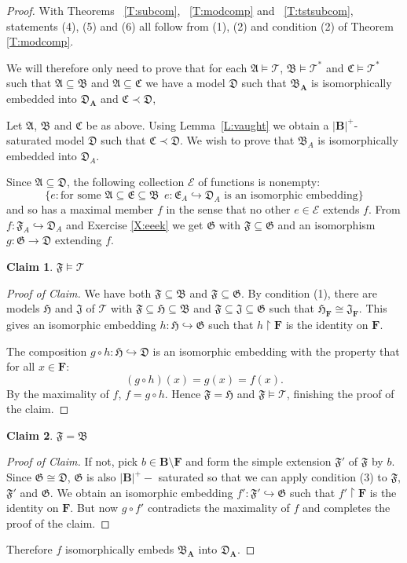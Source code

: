 \documentclass[titlepage, oneside]{amsbook}
\theoremstyle{plain}
\newtheorem*{claim}{Claim}
\theoremstyle{definition}
\theoremstyle{remark}
\newcommand{\theory}{\ensuremath{\mathcal{T}}}
\newcommand{\tee}{\ensuremath{\mathcal{T}}}
\newcommand{\tstar}{\ensuremath{\mathcal{T}^{\ast}}}
\newcommand{\seq}{\ensuremath{\subseteq}}
\newcommand{\ma}{\ensuremath{\mathfrak{A}}}
\newcommand{\mb}{\ensuremath{\mathfrak{B}}}
\newcommand{\mc}{\ensuremath{\mathfrak{C}}}
\newcommand{\md}{\ensuremath{\mathfrak{D}}}
\newcommand{\me}{\ensuremath{\mathfrak{E}}}
\newcommand{\mf}{\ensuremath{\mathfrak{F}}}
\newcommand{\mg}{\ensuremath{\mathfrak{G}}}
\newcommand{\mh}{\ensuremath{\mathfrak{H}}}
\newcommand{\mj}{\ensuremath{\mathfrak{J}}}
\newcommand{\ba}{\ensuremath{\mathbf{A}}}
\newcommand{\bb}{\ensuremath{\mathbf{B}}}
\begin{document}
\begin{proof}  With  Theorems ~\ref{T:subcom}, ~\ref{T:modcomp} and 
~\ref{T:tstsubcom}, statements (4), (5) and (6) all follow from (1), (2) and 
condition (2) of Theorem \ref{T:modcomp}.
 
We will therefore only need to prove that
for each $\ma \models \theory$, $\mb \models \theory^{\ast}$
and $\mc \models \tstar$ such that $\ma \seq \mb$ and $\ma \seq \mc$ we
have a model $\md$ such that $\mb_\ba$ is isomorphically embedded into
$\md_\ba$ and $\mc \prec \md$,

Let $\ma$, $\mb$ and $\mc$ be as above.  Using Lemma~\ref{L:vaught} we
obtain a $|\bb|^+$-saturated model $\md$ such that $\mc \prec \md$. 
We wish to prove that $\mb _{A} $ is isomorphically embedded into $\md _{A} $.

Since $\ma \subseteq \md$, the following collection $\mathcal{E}$ of functions is nonempty:
	\[
     \{ e : \mbox{for some } \ma \subseteq \me \subseteq \mb \ \ e \colon \me _{A}  
\hookrightarrow \md _{A} \mbox{ is an isomorphic embedding} \}
	\]
and so has a maximal member $f$ in the sense that no other $e \in \mathcal{E}$ 
extends $f$. 
From $f \colon \mf _{A} \hookrightarrow \md _{A}$ and Exercise \ref{X:eeek} we get $\mg$ with $\mf \subseteq \mg$ and an isomorphism $g \colon \mg \rightarrow \md $ 
extending $f$.

\begin{claim}
$\mf \models \tee $
\end{claim}
\begin{proof}[Proof of Claim]
We have both $\mf \subseteq \mb$ and $\mf \subseteq \mg$. By condition (1), there are models $\mh$ and $\mj$ of $\tee$ with  
$\mf \subseteq \mh \subseteq \mb$ and $\mf \subseteq \mj \subseteq \mg$ 
such that $\mh _{\mathbf{F}} \cong \mj _{\mathbf{F}}$.
This gives an isomorphic embedding $h \colon \mh \hookrightarrow \mg$ such 
that $h \! \upharpoonright \! \mathbf{F}$ is the identity on $\mathbf{F}$.

The composition $g \circ h \colon \mh \hookrightarrow \md $ is an isomorphic embedding with the property that for all $x \in \mathbf{F}$:
	\[
            (g \circ h) (x) = g(x) = f(x).
	\]
By the maximality of $f$, $f = g \circ h$. Hence $\mf = \mh$ and 
$\mf \models \tee$, finishing the proof of the claim.
\renewcommand{\qedsymbol}{}
\end{proof}
\begin{claim}
$\mf = \mb $
\end{claim}
\begin{proof}[Proof of Claim]
If not, pick $b \in \bb \setminus \mathbf{F}$ and form the simple extension 
$\mf '$ of $\mf$ by $b$. Since $\mg \cong \md$, $\mg$ is also $|\bb |^{+} -$ saturated so that we can apply condition (3) to $\mf$, $\mf '$ and $\mg$. 
We obtain an isomorphic embedding $f' \colon \mf ' \hookrightarrow \mg$ 
such that $f' \! \upharpoonright \! \mathbf{F}$ is the identity on $\mathbf{F}$. 
But now $g \circ f'$ contradicts the maximality of $f$ and completes the proof of the claim.
\renewcommand{\qedsymbol}{}
\end{proof}
Therefore $f$ isomorphically embeds $\mb _{\ba}$ into $\md _{\ba}$.

\end{proof}
\end{document}
